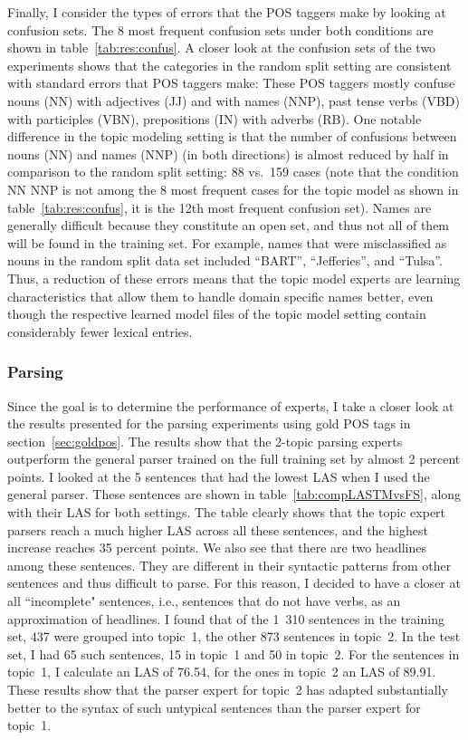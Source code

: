 Finally, I consider the types of errors that the POS taggers make by looking at confusion sets. %
The 8 most frequent confusion sets under both conditions are shown in table~\ref{tab:res:confus}. A closer look at the confusion sets of the two experiments shows that the categories in the random split setting are consistent with standard errors that POS taggers make: These POS taggers mostly confuse nouns (NN) with adjectives (JJ) and with names (NNP), past tense verbs (VBD) with participles (VBN), prepositions (IN) with adverbs (RB). One notable difference in the topic modeling setting is that the number of confusions between nouns (NN) and names (NNP) (in both directions) is almost reduced by half in comparison to the random split setting: 88 vs.\ 159 cases (note that the condition NN NNP is not among the 8 most frequent cases for the topic model as shown in table~\ref{tab:res:confus}, it is the 12th most frequent confusion set). Names are generally difficult because they constitute an open set, and thus not all of them will be found in the training set. For example, names that were misclassified as nouns in the random split data set included ``BART'', ``Jefferies'', and ``Tulsa''. Thus, a reduction of these errors means that the topic model experts are learning characteristics that allow them to handle domain specific names better, even though the respective learned model files of the topic model setting contain considerably fewer lexical entries.



\subsubsection*{\textbf{Parsing}}

Since the goal is to determine the performance of experts, I take a closer look at the results presented for the parsing experiments using gold POS tags in  section~\ref{sec:goldpos}. The results show that the 2-topic parsing experts outperform the general parser trained on the full training set by almost 2 percent points.  I looked at the 5 sentences that had the lowest LAS when I used the general parser. These sentences are shown in table~\ref{tab:compLASTMvsFS}, along with their LAS for both settings. The table clearly shows that the topic expert parsers reach a much higher LAS across all these sentences, and the highest increase reaches 35 percent points. We also see that there are two headlines among these sentences. They are different in their syntactic patterns from other sentences and thus difficult to parse. For this reason, I decided to have a closer at all ``incomplete" sentences, i.e., sentences that do not have verbs, as an approximation of headlines. I found that of the 1~310 sentences in the training set, 437 were grouped into topic~1, the other 873 sentences in topic~2. In the test set, I had 65 such sentences, 15 in topic~1 and 50 in topic~2. For the sentences in topic~1, I calculate an LAS of 76.54, for the ones in topic~2 an LAS of 89.91. These results show that the parser expert for topic~2 has adapted substantially better to the syntax of such untypical sentences than the parser expert for topic~1. 

